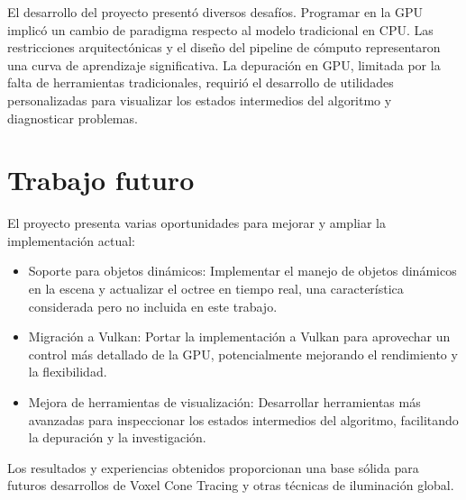 El desarrollo del proyecto presentó diversos desafíos.
Programar en la GPU implicó un cambio de paradigma respecto al modelo tradicional en CPU.
Las restricciones arquitectónicas y el diseño del pipeline de cómputo representaron una curva de aprendizaje significativa.
La depuración en GPU, limitada por la falta de herramientas tradicionales, requirió el desarrollo de utilidades personalizadas para visualizar los estados intermedios del algoritmo y diagnosticar problemas.

\section{Trabajo futuro}

El proyecto presenta varias oportunidades para mejorar y ampliar la implementación actual:

\begin{itemize}
    \item Soporte para objetos dinámicos: Implementar el manejo de objetos dinámicos en la escena y actualizar el octree en tiempo real, una característica considerada pero no incluida en este trabajo.
    \item Migración a Vulkan: Portar la implementación a Vulkan para aprovechar un control más detallado de la GPU, potencialmente mejorando el rendimiento y la flexibilidad.
    \item Mejora de herramientas de visualización: Desarrollar herramientas más avanzadas para inspeccionar los estados intermedios del algoritmo, facilitando la depuración y la investigación.
\end{itemize}

Los resultados y experiencias obtenidos proporcionan una base sólida para futuros desarrollos de Voxel Cone Tracing y otras técnicas de iluminación global.